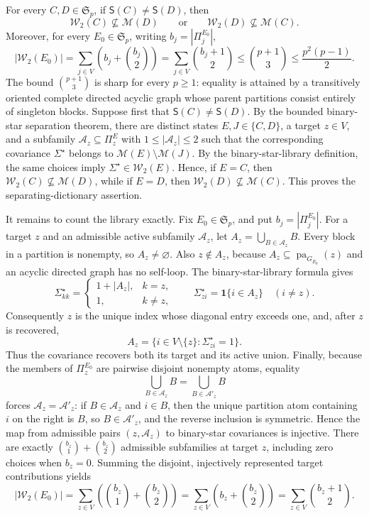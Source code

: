 For every \(C,D\in\mathfrak S_p\), if \(\mathsf S(C)\neq\mathsf S(D)\), then
\[
\mathcal W_2(C)\not\subseteq\mathcal M(D)
\qquad\text{or}\qquad
\mathcal W_2(D)\not\subseteq\mathcal M(C).
\]
Moreover, for every \(E_0\in\mathfrak S_p\), writing \(b_j=|\Pi^{E_0}_j|\),
\[
|\mathcal W_2(E_0)|
=\sum_{j\in V}\left(b_j+\binom{b_j}{2}\right)
=\sum_{j\in V}\binom{b_j+1}{2}
\leq\binom{p+1}{3}
\leq\frac{p^2(p-1)}{2}.
\]
The bound \(\binom{p+1}{3}\) is sharp for every \(p\geq1\): equality is attained by a transitively oriented complete directed acyclic graph whose parent partitions consist entirely of singleton blocks.
Suppose first that \(\mathsf S(C)\neq\mathsf S(D)\).  By the bounded binary-star separation theorem, there are distinct states \(E,J\in\{C,D\}\), a target \(z\in V\), and a subfamily \(\mathcal A_z\subseteq\Pi^E_z\) with \(1\leq|\mathcal A_z|\leq2\) such that the corresponding covariance \(\Sigma^{\star}\) belongs to \(\mathcal M(E)\setminus\mathcal M(J)\).  By the binary-star-library definition, the same choices imply \(\Sigma^{\star}\in\mathcal W_2(E)\).  Hence, if \(E=C\), then \(\mathcal W_2(C)\not\subseteq\mathcal M(D)\), while if \(E=D\), then \(\mathcal W_2(D)\not\subseteq\mathcal M(C)\).  This proves the separating-dictionary assertion.

It remains to count the library exactly.  Fix \(E_0\in\mathfrak S_p\), and put \(b_j=|\Pi^{E_0}_j|\).  For a target \(z\) and an admissible active subfamily \(\mathcal A_z\), let \(A_z=\bigcup_{B\in\mathcal A_z}B\).  Every block in a partition is nonempty, so \(A_z\neq\varnothing\).  Also \(z\notin A_z\), because \(A_z\subseteq\operatorname{pa}_{G_{E_0}}(z)\) and an acyclic directed graph has no self-loop.  The binary-star-library formula gives
\[
\Sigma^{\star}_{kk}
=
\begin{cases}
1+|A_z|,&k=z,\\
1,&k\neq z,
\end{cases}
\qquad
\Sigma^{\star}_{zi}=\mathbf 1\{i\in A_z\}\quad(i\neq z).
\]
Consequently \(z\) is the unique index whose diagonal entry exceeds one, and, after \(z\) is recovered,
\[
A_z=\{i\in V\setminus\{z\}:\Sigma^{\star}_{zi}=1\}.
\]
Thus the covariance recovers both its target and its active union.  Finally, because the members of \(\Pi^{E_0}_z\) are pairwise disjoint nonempty atoms, equality
\[
\bigcup_{B\in\mathcal A_z}B
=
\bigcup_{B\in\mathcal A'_z}B
\]
forces \(\mathcal A_z=\mathcal A'_z\): if \(B\in\mathcal A_z\) and \(i\in B\), then the unique partition atom containing \(i\) on the right is \(B\), so \(B\in\mathcal A'_z\), and the reverse inclusion is symmetric.  Hence the map from admissible pairs \((z,\mathcal A_z)\) to binary-star covariances is injective.  There are exactly \(\binom{b_z}{1}+\binom{b_z}{2}\) admissible subfamilies at target \(z\), including zero choices when \(b_z=0\).  Summing the disjoint, injectively represented target contributions yields
\[
|\mathcal W_2(E_0)|
=\sum_{z\in V}\left(\binom{b_z}{1}+\binom{b_z}{2}\right)
=\sum_{z\in V}\left(b_z+\binom{b_z}{2}\right)
=\sum_{z\in V}\binom{b_z+1}{2}.
\]

